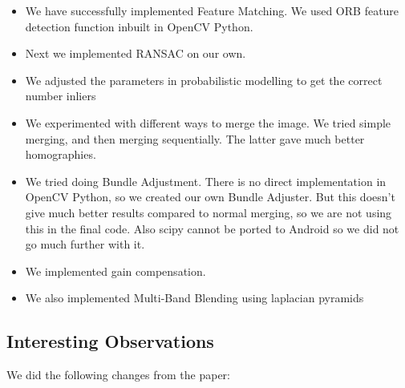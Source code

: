 \documentclass{article}
\begin{document}
\begin{itemize}
\item We have successfully implemented Feature Matching. We used ORB feature detection function inbuilt in OpenCV Python.
\item Next we  implemented RANSAC on our own. 
\item We adjusted the parameters in probabilistic modelling to get the correct number inliers
\item We experimented with different ways to merge the image. We tried simple merging, and then merging sequentially. The latter gave much better homographies.
\item We tried doing Bundle Adjustment. There is no direct implementation in OpenCV Python, so we created our own Bundle Adjuster. But this doesn’t give much better results compared to normal merging, so we are not using this in the final code. Also scipy cannot be ported to Android so we did not go much further with it.
\item We implemented gain compensation.
\item We also implemented Multi-Band Blending using laplacian pyramids
\end{itemize}

\subsection*{Interesting Observations}

We did the following changes from the paper:
\end{document}
